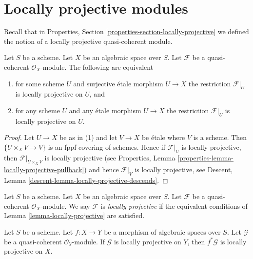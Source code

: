 \section{Locally projective modules}
\label{section-locally-projective}

\noindent
Recall that in
Properties, Section \ref{properties-section-locally-projective}
we defined the notion of a locally projective
quasi-coherent module.

\begin{lemma}
\label{lemma-locally-projective}
Let $S$ be a scheme. Let $X$ be an algebraic space over $S$.
Let $\mathcal{F}$ be a quasi-coherent $\mathcal{O}_X$-module.
The following are equivalent
\begin{enumerate}
\item for some scheme $U$ and surjective \'etale morphism
$U \to X$ the restriction $\mathcal{F}|_U$ is locally projective
on $U$, and
\item for any scheme $U$ and any \'etale morphism
$U \to X$ the restriction $\mathcal{F}|_U$ is locally projective
on $U$.
\end{enumerate}
\end{lemma}

\begin{proof}
Let $U \to X$ be as in (1) and let $V \to X$ be \'etale where
$V$ is a scheme. Then $\{U \times_X V \to V\}$ is an fppf covering
of schemes. Hence if $\mathcal{F}|_U$ is locally projective, then
$\mathcal{F}|_{U \times_X V}$ is locally projective (see
Properties, Lemma \ref{properties-lemma-locally-projective-pullback})
and hence $\mathcal{F}|_V$ is locally projective, see
Descent, Lemma \ref{descent-lemma-locally-projective-descends}.
\end{proof}

\begin{definition}
\label{definition-locally-projective}
Let $S$ be a scheme. Let $X$ be an algebraic space over $S$.
Let $\mathcal{F}$ be a quasi-coherent $\mathcal{O}_X$-module.
We say $\mathcal{F}$ is {\it locally projective}
if the equivalent conditions of
Lemma \ref{lemma-locally-projective}
are satisfied.
\end{definition}

\begin{lemma}
\label{lemma-locally-projective-pullback}
Let $S$ be a scheme.
Let $f : X \to Y$ be a morphism of algebraic spaces over $S$.
Let $\mathcal{G}$ be a quasi-coherent $\mathcal{O}_Y$-module.
If $\mathcal{G}$ is locally projective on $Y$, then $f^*\mathcal{G}$
is locally projective on $X$.
\end{lemma}

